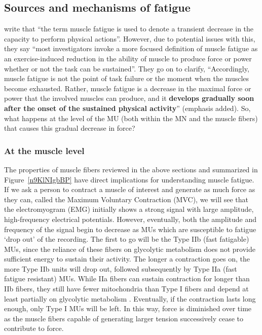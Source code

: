 \documentclass{article}
\begin{document}
\subsection{Sources and mechanisms of fatigue}

\citet{enoka2008muscle} write that ``the term muscle fatigue is used to denote a transient decrease in the capacity to perform physical actions''. However, due to potential issues with this, they say ``most investigators invoke a more focused definition of muscle fatigue as an exercise-induced reduction in the ability of muscle to produce force or power whether or not the task can be sustained''. They go on to clarify, ``Accordingly, muscle fatigue is not the point of task failure or the moment when the muscles become exhausted. Rather, muscle fatigue is a decrease in the maximal force or power that the involved muscles can produce, and it \textbf{develops gradually soon after the onset of the sustained physical activity}'' (emphasis added). So, what happens at the level of the MU (both within the MN and the muscle fibers) that causes this gradual decrease in force?

\subsubsection{At the muscle level}

The properties of muscle fibers reviewed in the above sections and summarized in Figure~\ref{n9KlNIgbBP} have direct implications for understanding muscle fatigue. If we ask a person to contract a muscle of interest and generate as much force as they can, called the Maximum Voluntary Contraction (MVC), we will see that the electromyogram (EMG) initially shows a strong signal with large amplitude, high-frequency electrical potentials. However, eventually, both the amplitude and frequency of the signal begin to decrease \citep{georgiou2017microelectronics} as MUs which are susceptible to fatigue `drop out' of the recording. The first to go will be the Type IIb (fast fatigable) MUs, since the reliance of these fibers on glycolytic metabolism does not provide sufficient energy to sustain their activity. The longer a contraction goes on, the more Type IIb units will drop out, followed subsequently by Type IIa (fast fatigue resistant) MUs. While IIa fibers can sustain contraction for longer than IIb fibers, they still have fewer mitochondria than Type I fibers and depend at least partially on glycolytic metabolism \citep{Weinberger2010}. Eventually, if the contraction lasts long enough, only Type I MUs will be left. In this way, force is diminished over time as the muscle fibers capable of generating larger tension successively cease to contribute to force.
\end{document}
